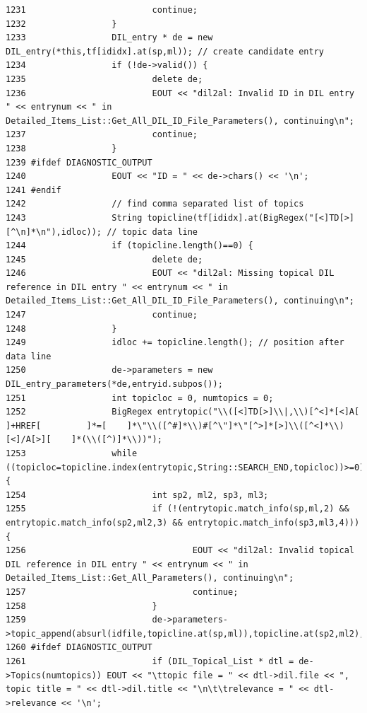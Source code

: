 \begin{verbatim}
1231                         continue;
1232                 }
1233                 DIL_entry * de = new DIL_entry(*this,tf[ididx].at(sp,ml)); // create candidate entry
1234                 if (!de->valid()) {
1235                         delete de;
1236                         EOUT << "dil2al: Invalid ID in DIL entry " << entrynum << " in Detailed_Items_List::Get_All_DIL_ID_File_Parameters(), continuing\n";
1237                         continue;
1238                 }
1239 #ifdef DIAGNOSTIC_OUTPUT
1240                 EOUT << "ID = " << de->chars() << '\n';
1241 #endif
1242                 // find comma separated list of topics
1243                 String topicline(tf[ididx].at(BigRegex("[<]TD[>][^\n]*\n"),idloc)); // topic data line
1244                 if (topicline.length()==0) {
1245                         delete de;
1246                         EOUT << "dil2al: Missing topical DIL reference in DIL entry " << entrynum << " in Detailed_Items_List::Get_All_DIL_ID_File_Parameters(), continuing\n";
1247                         continue;
1248                 }
1249                 idloc += topicline.length(); // position after data line
1250                 de->parameters = new DIL_entry_parameters(*de,entryid.subpos());
1251                 int topicloc = 0, numtopics = 0;
1252                 BigRegex entrytopic("\\([<]TD[>]\\|,\\)[^<]*[<]A[       ]+HREF[         ]*=[    ]*\"\\([^#]*\\)#[^\"]*\"[^>]*[>]\\([^<]*\\)[<]/A[>][    ]*(\\([^)]*\\))");
1253                 while ((topicloc=topicline.index(entrytopic,String::SEARCH_END,topicloc))>=0) {
1254                         int sp2, ml2, sp3, ml3;
1255                         if (!(entrytopic.match_info(sp,ml,2) && entrytopic.match_info(sp2,ml2,3) && entrytopic.match_info(sp3,ml3,4))) {
1256                                 EOUT << "dil2al: Invalid topical DIL reference in DIL entry " << entrynum << " in Detailed_Items_List::Get_All_Parameters(), continuing\n";
1257                                 continue;
1258                         }
1259                         de->parameters->topic_append(absurl(idfile,topicline.at(sp,ml)),topicline.at(sp2,ml2),atof(String(topicline.at(sp3,ml3))));
1260 #ifdef DIAGNOSTIC_OUTPUT
1261                         if (DIL_Topical_List * dtl = de->Topics(numtopics)) EOUT << "\ttopic file = " << dtl->dil.file << ", topic title = " << dtl->dil.title << "\n\t\trelevance = " << dtl->relevance << '\n';

\end{verbatim}
